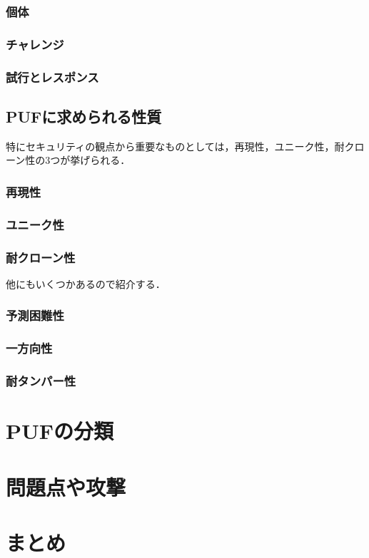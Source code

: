 \documentclass[survey]{ieicej}%
\begin{document}
\subsubsection{個体}
\subsubsection{チャレンジ}
\subsubsection{試行とレスポンス}
\subsection{PUFに求められる性質}
特にセキュリティの観点から重要なものとしては，再現性，ユニーク性，耐クローン性の3つが挙げられる．
\subsubsection{再現性}
\subsubsection{ユニーク性}
\subsubsection{耐クローン性}

他にもいくつかあるので紹介する．
\subsubsection{予測困難性}
\subsubsection{一方向性}
\subsubsection{耐タンパー性}

\section{PUFの分類}
\section{問題点や攻撃}
\section{まとめ}


%
%
\begin{thebibliography}{99}%
  \bibitem{}
\end{thebibliography}


\end{document}

